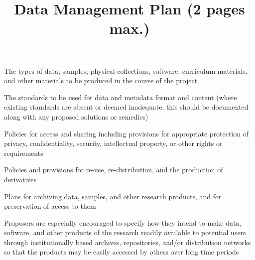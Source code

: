 \documentclass[11pt]{article}
\title{Data Management Plan (2 pages max.)}
\date{}
\newenvironment{coi}{\compactitem}{\endcompactitem} %
\begin{document}
\maketitle

\vspace{-1.6cm}

\singlespacing

	\begin{coi}
		\item The types of data, samples, physical collections, software, curriculum materials, and other materials to be produced in the course of the project
		\item The standards to be used for data and metadata format and content (where existing standards are absent or deemed inadequate, this should be documented along with any proposed solutions or remedies)
		\item Policies for access and sharing including provisions for appropriate protection of privacy, confidentiality, security, intellectual property, or other rights or requirements
		\item Policies and provisions for re-use, re-distribution, and the production of derivatives
		\item Plans for archiving data, samples, and other research products, and for preservation of access to them 
		\item Proposers are especially encouraged to specify how they intend to make data, software, and other products of the research readily available to potential users through institutionally based archives, repositories, and/or distribution networks so that the products may be easily accessed by others over long time periods
	\end{coi}



 
\end{document}

